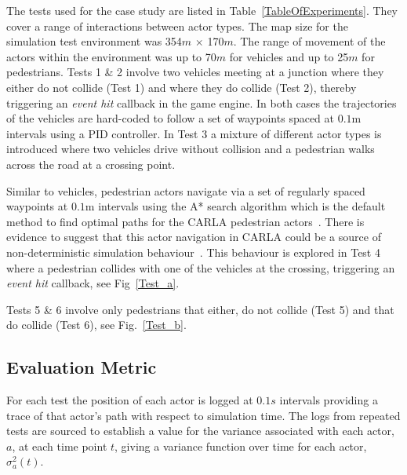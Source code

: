 The tests used for the case study are listed in Table~\ref{TableOfExperiments}. They cover a range of interactions between actor types. The map size for the simulation test environment was 354$m$ $\times$ 170$m$. The range of movement of the actors within the environment was up to 70$m$ for vehicles and up to 25$m$ for pedestrians.
%
Tests 1 \& 2 involve two vehicles meeting at a junction where they either do not collide (Test 1) and where they do collide (Test 2), thereby triggering an \textit{event hit} callback in the game engine. In both cases the trajectories of the vehicles are hard-coded to follow a set of waypoints spaced at $0.1$m intervals using a PID controller. 
%
In Test 3 a mixture of different actor types is introduced where two vehicles drive without collision and a pedestrian walks across the road at a crossing point. 

Similar to vehicles, pedestrian actors navigate via a set of regularly spaced waypoints at $0.1$m intervals using the A* search algorithm which is the default method to find optimal paths for the CARLA pedestrian actors~\cite{newton2016unreal}. 
%
There is evidence to suggest that this actor navigation in CARLA could be a source of non-deterministic simulation behaviour~\cite{CARLABenchmark}. 
%
This behaviour is explored in Test 4 where a pedestrian collides with one of the vehicles at the crossing, triggering an \textit{event hit} callback, see Fig~\ref{Test_a}.  
%

Tests 5 \& 6 involve only pedestrians that either, do not collide (Test 5) and that do collide (Test 6), see Fig.~\ref{Test_b}. 


\subsection{Evaluation Metric}\label{s:Experiment_Description}
For each test the position of each actor is logged at $0.1s$ intervals providing a trace of that actor's path with respect to simulation time. The logs from repeated tests are sourced to establish a value for the variance associated with each actor, $a$, at each time point $t$, giving a variance function over time for each actor, $\sigma_a^{2}(t)$.


